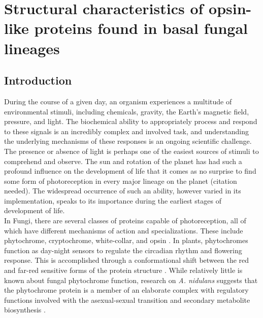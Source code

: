 \chapter{Structural characteristics of opsin-like proteins found in basal fungal lineages}
\label{chap:RhodStruct}
\section{Introduction}
During the course of a given day, an organism experiences a multitude of environmental stimuli, including chemicals, gravity, the Earth's magnetic field, pressure, and light. The biochemical ability to appropriately process and respond to these signals is an incredibly complex and involved task, and understanding the underlying mechanisms of these responses is an ongoing scientific challenge. \\
\indent The presence or absence of light is perhaps one of the easiest sources of stimuli to comprehend and observe. The sun and rotation of the planet has had such a profound influence on the development of life that it comes as no surprise to find some form of photoreception in every major lineage on the planet (citation needed). The widespread occurrence of such an ability, however varied in its implementation, speaks to its importance during the earliest stages of development of life. \\
\indent In Fungi, there are several classes of proteins capable of photoreception, all of which have different mechanisms of action and specializations. These include phytochrome, cryptochrome, white-collar, and opsin \cite{Idnurm2010}. In plants, phytochromes function as day-night sensors to regulate the circadian rhythm and flowering response. This is accomplished through a conformational shift between the red and far-red sensitive forms of the protein structure \cite{Rockwell2006}. While relatively little is known about fungal phytochrome function, research on \textit{A. nidulans} suggests that the phytochrome protein is a member of an elaborate complex with regulatory functions involved with the asexual-sexual transition and secondary metabolite biosynthesis \cite{Idnurm2010}.\\

